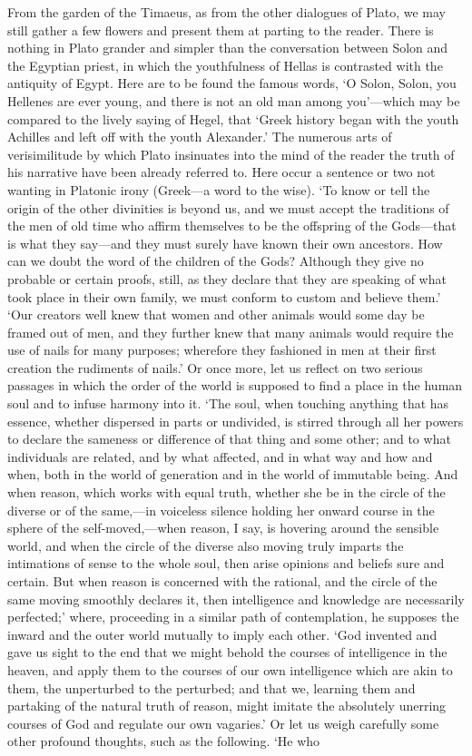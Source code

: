 \documentclass[11pt,letter]{article}
\begin{document}
\par  From the garden of the Timaeus, as from the other dialogues of Plato, we may still gather a few flowers and present them at parting to the reader. There is nothing in Plato grander and simpler than the conversation between Solon and the Egyptian priest, in which the youthfulness of Hellas is contrasted with the antiquity of Egypt. Here are to be found the famous words, ‘O Solon, Solon, you Hellenes are ever young, and there is not an old man among you’—which may be compared to the lively saying of Hegel, that ‘Greek history began with the youth Achilles and left off with the youth Alexander.’ The numerous arts of verisimilitude by which Plato insinuates into the mind of the reader the truth of his narrative have been already referred to. Here occur a sentence or two not wanting in Platonic irony (Greek—a word to the wise). ‘To know or tell the origin of the other divinities is beyond us, and we must accept the traditions of the men of old time who affirm themselves to be the offspring of the Gods—that is what they say—and they must surely have known their own ancestors. How can we doubt the word of the children of the Gods? Although they give no probable or certain proofs, still, as they declare that they are speaking of what took place in their own family, we must conform to custom and believe them.’ ‘Our creators well knew that women and other animals would some day be framed out of men, and they further knew that many animals would require the use of nails for many purposes; wherefore they fashioned in men at their first creation the rudiments of nails.’ Or once more, let us reflect on two serious passages in which the order of the world is supposed to find a place in the human soul and to infuse harmony into it. ‘The soul, when touching anything that has essence, whether dispersed in parts or undivided, is stirred through all her powers to declare the sameness or difference of that thing and some other; and to what individuals are related, and by what affected, and in what way and how and when, both in the world of generation and in the world of immutable being. And when reason, which works with equal truth, whether she be in the circle of the diverse or of the same,—in voiceless silence holding her onward course in the sphere of the self-moved,—when reason, I say, is hovering around the sensible world, and when the circle of the diverse also moving truly imparts the intimations of sense to the whole soul, then arise opinions and beliefs sure and certain. But when reason is concerned with the rational, and the circle of the same moving smoothly declares it, then intelligence and knowledge are necessarily perfected;’ where, proceeding in a similar path of contemplation, he supposes the inward and the outer world mutually to imply each other. ‘God invented and gave us sight to the end that we might behold the courses of intelligence in the heaven, and apply them to the courses of our own intelligence which are akin to them, the unperturbed to the perturbed; and that we, learning them and partaking of the natural truth of reason, might imitate the absolutely unerring courses of God and regulate our own vagaries.’ Or let us weigh carefully some other profound thoughts, such as the following. ‘He who 
\end{document}
